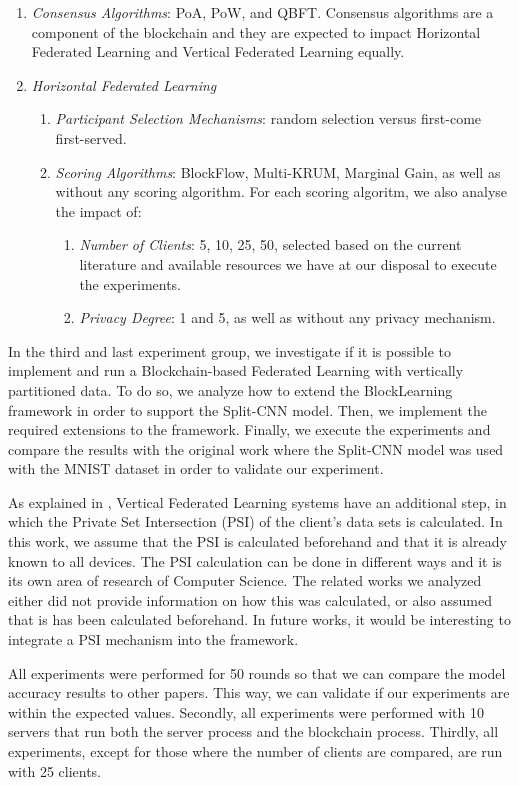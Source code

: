 \begin{enumerate}
    \item \textit{Consensus Algorithms}: PoA, PoW, and QBFT. Consensus algorithms are a component of the blockchain and they are expected to impact Horizontal Federated Learning and Vertical Federated Learning equally.
    
    \item \textit{Horizontal Federated Learning}
    
    \begin{enumerate}
        \item \textit{Participant Selection Mechanisms}: random selection versus first-come first-served.
        
        \item \textit{Scoring Algorithms}: BlockFlow, Multi-KRUM, Marginal Gain, as well as without any scoring algorithm. For each scoring algoritm, we also analyse the impact of:
        
        \begin{enumerate}
            \item \textit{Number of Clients}: 5, 10, 25, 50, selected based on the current literature and available resources we have at our disposal to execute the experiments.
            
            \item \textit{Privacy Degree}: 1 and 5, as well as without any privacy mechanism.
        \end{enumerate}
    \end{enumerate}
\end{enumerate}

In the third and last experiment group, we investigate if it is possible to implement and run a Blockchain-based Federated Learning with vertically partitioned data. To do so, we analyze how to extend the BlockLearning framework in order to support the Split-CNN model. Then, we implement the required extensions to the framework. Finally, we execute the experiments and compare the results with the original work where the Split-CNN model was used with the MNIST dataset in order to validate our experiment.

As explained in , Vertical Federated Learning systems have an additional step, in which the Private Set Intersection (PSI) of the client's data sets is calculated. In this work, we assume that the PSI is calculated beforehand and that it is already known to all devices. The PSI calculation can be done in different ways and it is its own area of research of Computer Science. The related works we analyzed either did not provide information on how this was calculated, or also assumed that is has been calculated beforehand. In future works, it would be interesting to integrate a PSI mechanism into the framework.

All experiments were performed for 50 rounds so that we can compare the model accuracy results to other papers. This way, we can validate if our experiments are within the expected values. Secondly, all experiments were performed with 10 servers that run both the server process and the blockchain process. Thirdly, all experiments, except for those where the number of clients are compared, are run with 25 clients.

